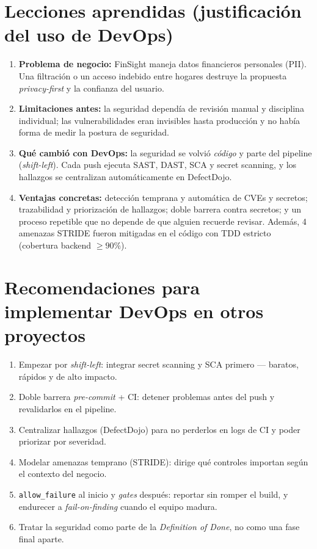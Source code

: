 \documentclass[11pt,a4paper]{article}
\begin{document}
\section{Lecciones aprendidas (justificación del uso de DevOps)}
\begin{enumerate}[label=\textbf{\arabic*.}]
  \item \textbf{Problema de negocio:} FinSight maneja datos financieros personales (PII). Una filtración o un
        acceso indebido entre hogares destruye la propuesta \emph{privacy-first} y la confianza del usuario.
  \item \textbf{Limitaciones antes:} la seguridad dependía de revisión manual y disciplina individual; las
        vulnerabilidades eran invisibles hasta producción y no había forma de medir la postura de seguridad.
  \item \textbf{Qué cambió con DevOps:} la seguridad se volvió \emph{código} y parte del pipeline
        (\emph{shift-left}). Cada push ejecuta SAST, DAST, SCA y secret scanning, y los hallazgos se
        centralizan automáticamente en DefectDojo.
  \item \textbf{Ventajas concretas:} detección temprana y automática de CVEs y secretos; trazabilidad y
        priorización de hallazgos; doble barrera contra secretos; y un proceso repetible que no depende de
        que alguien recuerde revisar. Además, 4 amenazas STRIDE fueron mitigadas en el código con TDD estricto
        (cobertura backend $\ge 90\%$).
\end{enumerate}

\section{Recomendaciones para implementar DevOps en otros proyectos}
\begin{enumerate}[label=\textbf{\arabic*.}]
  \item Empezar por \emph{shift-left}: integrar secret scanning y SCA primero --- baratos, rápidos y de alto impacto.
  \item Doble barrera \emph{pre-commit} + CI: detener problemas antes del push y revalidarlos en el pipeline.
  \item Centralizar hallazgos (DefectDojo) para no perderlos en logs de CI y poder priorizar por severidad.
  \item Modelar amenazas temprano (STRIDE): dirige qué controles importan según el contexto del negocio.
  \item \texttt{allow\_failure} al inicio y \emph{gates} después: reportar sin romper el build, y endurecer a
        \emph{fail-on-finding} cuando el equipo madura.
  \item Tratar la seguridad como parte de la \emph{Definition of Done}, no como una fase final aparte.
\end{enumerate}
\end{document}

